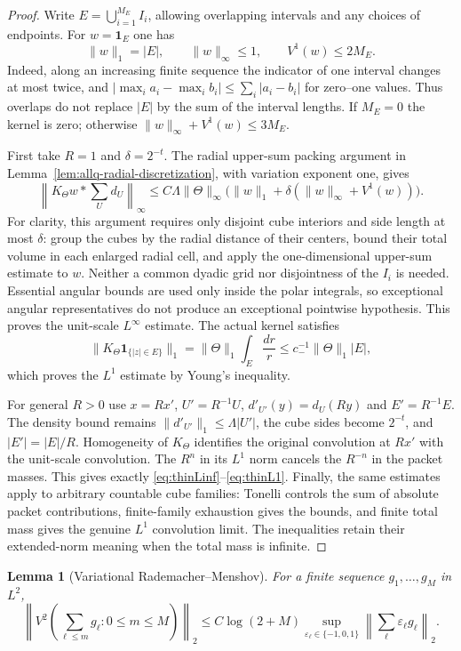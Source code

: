 \documentclass[11pt]{article}
\numberwithin{equation}{section}
\newtheorem{lemma}[theorem]{Lemma}
\theoremstyle{remark}
\theoremstyle{definition}
\begin{document}
\begin{proof}
Write $E=\bigcup_{i=1}^{M_E}I_i$, allowing overlapping intervals and
any choices of endpoints.  For $w=\mathbf1_E$ one has
\[
 \|w\|_1=|E|,\qquad \|w\|_\infty\le1,\qquad
 V^1(w)\le2M_E.
\]
Indeed, along an increasing finite sequence the indicator of one interval
changes at most twice, and
$|\max_i a_i-\max_i b_i|\le\sum_i|a_i-b_i|$ for zero--one values.
Thus overlaps do not replace $|E|$ by the sum of the interval lengths.
If $M_E=0$ the kernel is zero; otherwise
$\|w\|_\infty+V^1(w)\le3M_E$.

First take $R=1$ and $\delta=2^{-t}$.  The radial upper-sum packing
argument in Lemma~\ref{lem:allq-radial-discretization}, with variation
exponent one, gives
\[
 \left\|K_\Theta w*\sum_Ud_U\right\|_\infty
 \le C\Lambda\|\Theta\|_\infty
       \bigl(\|w\|_1+\delta(\|w\|_\infty+V^1(w))\bigr).
\]
For clarity, this argument requires only disjoint cube interiors and
side length at most $\delta$: group the cubes by the radial distance of
their centers, bound their total volume in each enlarged radial cell,
and apply the one-dimensional upper-sum estimate to $w$.  Neither a
common dyadic grid nor disjointness of the $I_i$ is needed.  Essential
angular bounds are used only inside the polar integrals, so exceptional
angular representatives do not produce an exceptional pointwise
hypothesis.  This proves the unit-scale $L^\infty$ estimate.
The actual kernel satisfies
\[
 \|K_\Theta\mathbf1_{\{|z|\in E\}}\|_1
 =\|\Theta\|_1\int_E\frac{dr}{r}
 \le c_-^{-1}\|\Theta\|_1|E|,
\]
which proves the $L^1$ estimate by Young's inequality.

For general $R>0$ use $x=Rx'$, $U'=R^{-1}U$,
$d'_{U'}(y)=d_U(Ry)$ and $E'=R^{-1}E$.  The density bound remains
$\|d'_{U'}\|_1\le\Lambda|U'|$, the cube sides become $2^{-t}$,
and $|E'|=|E|/R$.  Homogeneity of $K_\Theta$ identifies the original
convolution at $Rx'$ with the unit-scale convolution.  The $R^n$ in
its $L^1$ norm cancels the $R^{-n}$ in the packet masses.  This gives
exactly \eqref{eq:thinLinf}--\eqref{eq:thinL1}.
Finally, the same estimates apply to arbitrary countable cube families:
Tonelli controls the sum of absolute packet contributions, finite-family
exhaustion gives the bounds, and finite total mass gives the genuine
$L^1$ convolution limit.  The inequalities retain their extended-norm
meaning when the total mass is infinite.
\end{proof}

\begin{lemma}[Variational Rademacher--Menshov]\label{lem:RM}
For a finite sequence $g_1,\ldots,g_M$ in $L^2$,
\begin{equation}\label{eq:RM}
 \left\|V^2\left(\sum_{\ell\le m}g_\ell:0\le m\le M\right)\right\|_2
 \le C\log(2+M)
 \sup_{\varepsilon_\ell\in\{-1,0,1\}}
 \left\|\sum_\ell\varepsilon_\ell g_\ell\right\|_2.
\end{equation}
\end{lemma}
\end{document}

